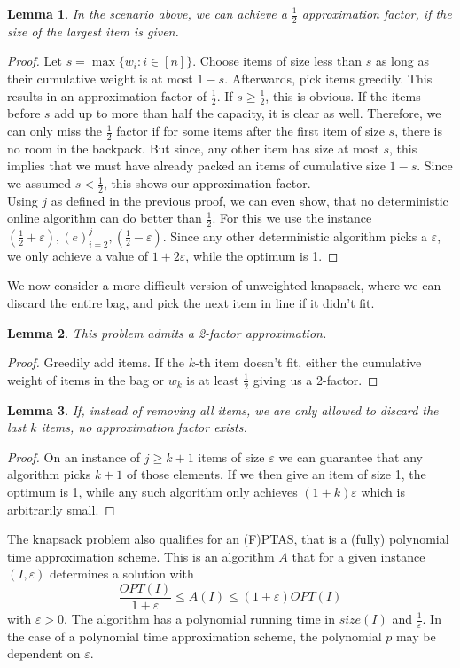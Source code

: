 \documentclass[a4paper, 12pt]{article}
\newtheorem{lemma}{Lemma}[section]
\begin{document}
	\begin{lemma}
		In the scenario above, we can achieve a $\frac{1}{2}$ approximation factor, if the size of the largest item is given.
	\end{lemma}
	\begin{proof}
		Let $s = \max\{w_i: i \in [n]\}$. Choose items of size less than $s$ as long as their cumulative weight is at most $1-s$. Afterwards, pick items greedily. This results in an approximation factor of $\frac{1}{2}$. If $s \geq \frac{1}{2}$, this is obvious. If the items before $s$ add up to more than half the capacity, it is clear as well. Therefore, we can only miss the $\frac{1}{2}$ factor if for some items after the first item of size $s$, there is no room in the backpack. But since, any other item has size at most $s$, this implies that we must have already packed an items of cumulative size $1-s$. Since we assumed $s < \frac{1}{2}$, this shows our approximation factor.\\
		Using $j$ as defined in the previous proof, we can even show, that no deterministic online algorithm can do better than $\frac{1}{2}$. For this we use the instance $(\frac{1}{2} + \varepsilon), (e)_{i=2}^j, (\frac{1}{2} - \varepsilon)$. Since any other deterministic algorithm picks a $\varepsilon$, we only achieve a value of $1+2\varepsilon$, while the optimum is 1.
	\end{proof}
	We now consider a more difficult version of unweighted knapsack, where we can discard the entire bag, and pick the next item in line if it didn't fit.
	\begin{lemma}
		This problem admits a 2-factor approximation.
	\end{lemma}
	\begin{proof}
		Greedily add items. If the $k$-th item doesn't fit, either the cumulative weight of items in the bag or $w_k$ is at least $\frac{1}{2}$ giving us a 2-factor.
	\end{proof}
	\begin{lemma}
		If, instead of removing all items, we are only allowed to discard the last $k$ items, no approximation factor exists.
	\end{lemma}
	\begin{proof}
		On an instance of $j \geq k+1$ items of size $\varepsilon$ we can guarantee that any algorithm picks $k+1$ of those elements. If we then give an item of size 1, the optimum is 1, while any such algorithm only achieves $(1+k)\varepsilon$ which is arbitrarily small.
	\end{proof}
	The knapsack problem also qualifies for an (F)PTAS, that is a (fully) polynomial time approximation scheme. This is an algorithm $A$ that for a given instance $(I, \varepsilon)$ determines a solution with \[\frac{OPT(I)}{1+\varepsilon} \leq A(I) \leq (1+\varepsilon)OPT(I)\] with $\varepsilon > 0$. The algorithm has a polynomial running time in $size(I)$ and $\frac{1}{\varepsilon}$. In the case of a polynomial time approximation scheme, the polynomial $p$ may be dependent on $\varepsilon$.
\end{document}
